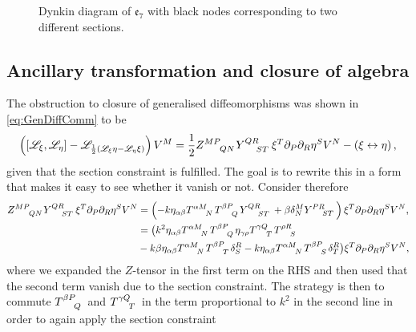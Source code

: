 \begin{figure}
    \caption{Dynkin diagram of $\mathfrak{e}_7$ with black nodes corresponding to two different sections.}
    \label{fig:E7WithSection}
\end{figure}



\subsection{Ancillary transformation and closure of algebra\label{sec:AncillaryTransformationsAndClosure}}
The obstruction to closure of generalised diffeomorphisms was shown in \eqref{eq:GenDiffComm} to be  
\begin{equation}\label{eq:GenDiffComm2}
    \left(\left[\mathscr{L}_\xi,\mathscr{L}_\eta\right]-\mathscr{L}_{\frac{1}{2}\left(\mathscr{L}_\xi\eta-\mathscr{L}_\eta\xi\right)}\right)V^M = \frac{1}{2}\tensor{Z}{^{MP}_{QN}}\tensor{Y}{^{QR}_{ST}}\xi^T\pd_P\pd_R\eta^SV^N-\left(\xi\leftrightarrow\eta\right),
\end{equation}
given that the section constraint is fulfilled. The goal is to rewrite this in a form that makes it easy to see whether it vanish or not. Consider therefore
\begin{equation}\label{eq:RemainderTermGauge}
    \begin{aligned}
        \tensor{Z}{^{MP}_{QN}}\tensor{Y}{^{QR}_{ST}}\xi^T\pd_P\pd_R\eta^SV^N &= \left(-k\eta_{\alpha\beta}\tensor{T}{^{\alpha M}_N}\tensor{T}{^{\beta P}_Q}\tensor{Y}{^{QR}_{ST}}+\beta \delta^M_N\tensor{Y}{^{PR}_{ST}}\right)\xi^T\pd_P\pd_R\eta^SV^N,\\
        &= \big(k^2\eta_{\alpha\beta}\tensor{T}{^{\alpha M}_N}\tensor{T}{^{\beta P}_Q}\eta_{\gamma\rho}\tensor{T}{^{\gamma Q}_T}\tensor{T}{^{\rho R}_S}\\
        &-k\beta\eta_{\alpha\beta}\tensor{T}{^{\alpha M}_N}\tensor{T}{^{\beta P}_T}\delta^R_S-k\eta_{\alpha\beta}\tensor{T}{^{\alpha M}_N}\tensor{T}{^{\beta P}_S}\delta^{R}_T\big)\xi^T\pd_P\pd_R\eta^SV^N,
    \end{aligned}
\end{equation}
where we expanded the $Z$-tensor in the first term on the RHS and then used that the second term vanish due to the section constraint. The strategy is then to commute $\tensor{T}{^{\beta P}_Q}$ and $\tensor{T}{^{\gamma Q}_T}$ in the term proportional to $k^2$ in the second line in order to again apply the section constraint
